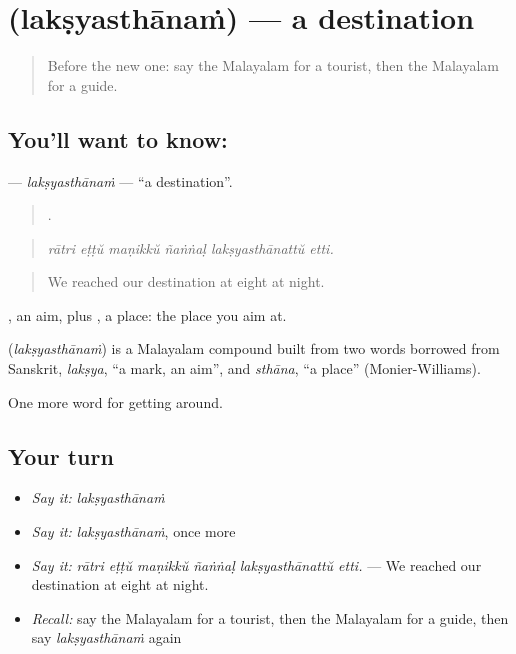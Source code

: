\section[\texorpdfstring{\ml{ലക്ഷ്യസ്ഥാനം} (lakṣyasthānaṁ)}{ലക്ഷ്യസ്ഥാനം (lakṣyasthānaṁ)}]{ (lakṣyasthānaṁ) — a destination}

\label{lesson:ML-C478-laksyasthanam}



\begin{quote}
Before the new one: say the Malayalam for a tourist, then the Malayalam for a guide.
\end{quote}

\subsection*{You'll want to know: }
\textbf{} — \emph{lakṣyasthānaṁ} — \textquotedblleft{}a destination\textquotedblright{}.

\begin{quote}
     .
\end{quote}

\begin{quote}
\emph{rātri eṭṭŭ maṇikkŭ ñaṅṅaḷ lakṣyasthānattŭ etti.}
\end{quote}

\begin{quote}
We reached our destination at eight at night.
\end{quote}

, an aim, plus , a place: the place you aim at.

\begin{cousinweb}
\textbf{} (\emph{lakṣyasthānaṁ}) is a Malayalam compound built from two words borrowed from Sanskrit, \emph{lakṣya}, \textquotedblleft{}a mark, an aim\textquotedblright{}, and \emph{sthāna}, \textquotedblleft{}a place\textquotedblright{} (Monier-Williams).
\end{cousinweb}

\begin{grammarlens}[title={What you've built}]
One more word for getting around.
\end{grammarlens}

\subsection*{Your turn}
\begin{itemize}
\raggedright
  \item \emph{Say it:} \emph{lakṣyasthānaṁ}
  \item \emph{Say it:} \emph{lakṣyasthānaṁ}, once more
  \item \emph{Say it:} \emph{rātri eṭṭŭ maṇikkŭ ñaṅṅaḷ lakṣyasthānattŭ etti.} — We reached our destination at eight at night.
  \item \emph{Recall:} say the Malayalam for a tourist, then the Malayalam for a guide, then say \emph{lakṣyasthānaṁ} again
\end{itemize}

